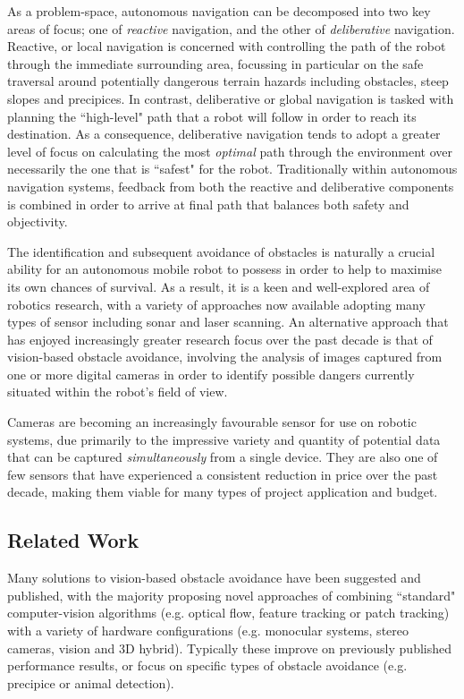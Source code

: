 As a problem-space, autonomous navigation can be decomposed into two key areas of focus; one of \textit{reactive} navigation, and the other of \textit{deliberative} navigation. Reactive, or local navigation is concerned with controlling the path of the robot through the immediate surrounding area, focussing in particular on the safe traversal around potentially dangerous terrain hazards including obstacles, steep slopes and precipices. In contrast, deliberative or global navigation is tasked with planning the ``high-level" path that a robot will follow in order to reach its destination. As a consequence, deliberative navigation tends to adopt a greater level of focus on calculating the most \textit{optimal} path through the environment over necessarily the one that is ``safest" for the robot. Traditionally within autonomous navigation systems, feedback from both the reactive and deliberative components is combined in order to arrive at final path that balances both safety and objectivity. 

The identification and subsequent avoidance of obstacles is naturally a crucial ability for an autonomous mobile robot to possess in order to help to maximise its own chances of survival. As a result, it is a keen and well-explored area of robotics research, with a variety of approaches now available adopting many types of sensor including sonar and laser scanning. An alternative approach that has enjoyed increasingly greater research focus over the past decade is that of vision-based obstacle avoidance, involving the analysis of images captured from one or more digital cameras in order to identify possible dangers currently situated within the robot's field of view. 

Cameras are becoming an increasingly favourable sensor for use on robotic systems, due primarily to the impressive variety and quantity of potential data that can be captured \textit{simultaneously} from a single device. They are also one of few sensors that have experienced a consistent reduction in price over the past decade, making them viable for many types of project application and budget. 


\subsection{Related Work}

Many solutions to vision-based obstacle avoidance have been suggested and published, with the majority proposing novel approaches of combining ``standard" computer-vision algorithms (e.g. optical flow, feature tracking or patch tracking) with a variety of hardware configurations (e.g. monocular systems, stereo cameras, vision and 3D hybrid). Typically these improve on previously published performance results, or focus on specific types of obstacle avoidance (e.g. precipice or animal detection).

